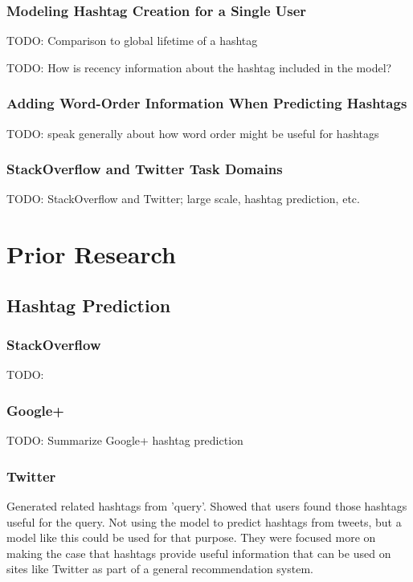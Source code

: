 \documentclass[man]{apa6}
\begin{document}
\subsubsection{Modeling Hashtag Creation for a Single User}

TODO: Comparison to global lifetime of a hashtag \cite{Tsur2012}

TODO: How is recency information about the hashtag included in the model?

\subsubsection{Adding Word-Order Information When Predicting Hashtags}

TODO: speak generally about how word order might be useful for hashtags

\subsubsection{StackOverflow and Twitter Task Domains}

TODO: StackOverflow and Twitter; large scale, hashtag prediction, etc. 

\section{Prior Research}

\subsection{Hashtag Prediction}

\subsubsection{StackOverflow}

TODO: \cite{Kuo2011}

\subsubsection{Google+}

TODO: Summarize Google+ hashtag prediction \cite{GoogleKeynote2013}

\subsubsection{Twitter}

\cite{Efron2010} Generated related hashtags from 'query'.
Showed that users found those hashtags useful for the query.
Not using the model to predict hashtags from tweets, but a model like this could be used for that purpose.
They were focused more on making the case that hashtags provide useful information that can be used on sites like Twitter as part of a general recommendation system.
\end{document}
